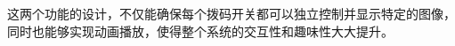 \documentclass{bjtu-bachelor-thesis}
\begin{document}
这两个功能的设计，不仅能确保每个拨码开关都可以独立控制并显示特定的图像，同时也能够实现动画播放，使得整个系统的交互性和趣味性大大提升。







\end{document}
